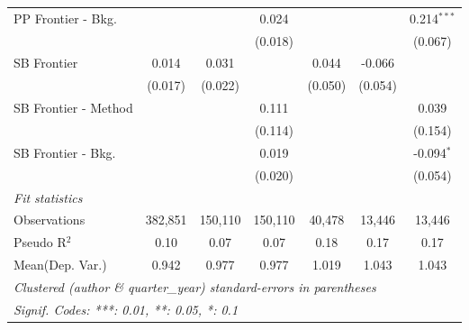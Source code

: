 \begin{tabular}{lcccccc}
   PP Frontier - Bkg.   &               &              & 0.024        &               &               & 0.214$^{***}$\\   
                        &               &              & (0.018)      &               &               & (0.067)\\   
   SB Frontier          & 0.014         & 0.031        &              & 0.044         & -0.066        &   \\   
                        & (0.017)       & (0.022)      &              & (0.050)       & (0.054)       &   \\   
   SB Frontier - Method &               &              & 0.111        &               &               & 0.039\\   
                        &               &              & (0.114)      &               &               & (0.154)\\   
   SB Frontier - Bkg.   &               &              & 0.019        &               &               & -0.094$^{*}$\\   
                        &               &              & (0.020)      &               &               & (0.054)\\   
   \midrule
   \emph{Fit statistics}\\
   Observations         & 382,851       & 150,110      & 150,110      & 40,478        & 13,446        & 13,446\\  
   Pseudo R$^2$         & 0.10          & 0.07         & 0.07         & 0.18          & 0.17          & 0.17\\  
Mean(Dep. Var.) & 0.942 & 0.977 & 0.977 & 1.019 & 1.043 & 1.043 \\
   \midrule \midrule
   \multicolumn{7}{l}{\emph{Clustered (author \& quarter\_year) standard-errors in parentheses}}\\
   \multicolumn{7}{l}{\emph{Signif. Codes: ***: 0.01, **: 0.05, *: 0.1}}\\
\end{tabular}
\par\endgroup
